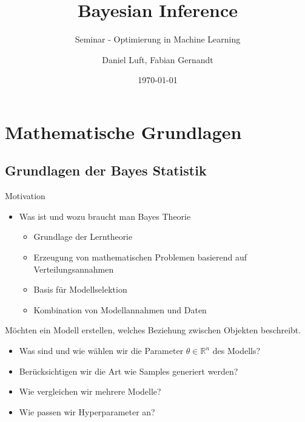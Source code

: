 \documentclass{beamer}
\title[Bayesian Inference]{Bayesian Inference}
\subtitle{Seminar - Optimierung in Machine Learning}
\author{Daniel Luft, Fabian Gernandt}
\date{\today}
\begin{document}
{
\frame{\titlepage}
\newcommand{\labelitemi}{$\bullet$}
\newcommand{\labelitemii}{$\rightarrow$}

\section{Mathematische Grundlagen}

\frame{\tableofcontents[currentsection,subsectionstyle=show/shaded,hideothersubsections]}

\subsection{Grundlagen der Bayes Statistik}


\begin{frame}{Motivation}
	\begin{itemize}
		\item Was ist und wozu braucht man Bayes Theorie 
		\begin{itemize}
			\item Grundlage der Lerntheorie
			\item Erzeugung von mathematischen Problemen basierend auf Verteilungsannahmen
			\item Basis für Modellselektion
			\item Kombination von Modellannahmen und Daten
		\end{itemize}
	\end{itemize}
\end{frame}


\begin{frame}
Möchten ein Modell erstellen, welches Beziehung zwischen Objekten beschreibt.

\begin{itemize}
\item Was sind und wie wählen wir die Parameter $\theta \in \mathbb{R}^n$ des Modells?
\item Berücksichtigen wir die Art wie Samples generiert werden?
\item Wie vergleichen wir mehrere Modelle?
\item Wie passen wir Hyperparameter an?
\end{itemize}
 

\end{frame}}
\end{document}
